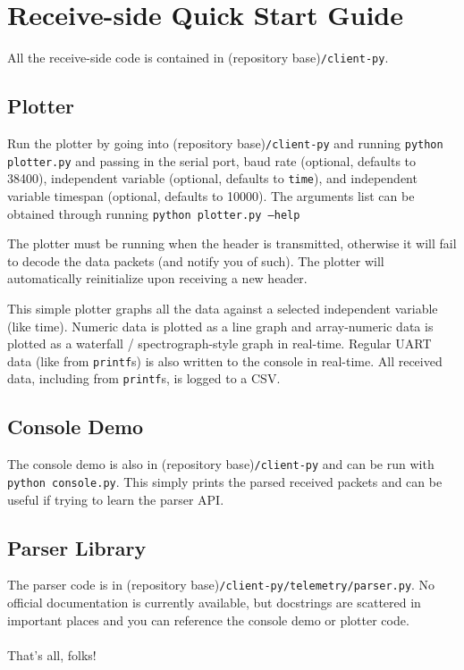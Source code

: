 \documentclass[11pt]{article}
\begin{document}
\section{Receive-side Quick Start Guide}
All the receive-side code is contained in (repository base)\texttt{/client-py}.
\subsection{Plotter}
Run the plotter by going into (repository base)\texttt{/client-py} and running \texttt{python plotter.py} and passing in the serial port, baud rate (optional, defaults to 38400), independent variable (optional, defaults to \texttt{time}), and independent variable timespan (optional, defaults to 10000). The arguments list can be obtained through running \texttt{python plotter.py --help}

The plotter must be running when the header is transmitted, otherwise it will fail to decode the data packets (and notify you of such). The plotter will automatically reinitialize upon receiving a new header.

This simple plotter graphs all the data against a selected independent variable (like time). Numeric data is plotted as a line graph and array-numeric data is plotted as a waterfall / spectrograph-style graph in real-time. Regular UART data (like from \texttt{printf}s) is also written to the console in real-time. All received data, including from \texttt{printf}s, is logged to a CSV.

\subsection{Console Demo}
The console demo is also in (repository base)\texttt{/client-py} and can be run with \texttt{python console.py}. This simply prints the parsed received packets and can be useful if trying to learn the parser API.

\subsection{Parser Library}
The parser code is in (repository base)\texttt{/client-py/telemetry/parser.py}. No official documentation is currently available, but docstrings are scattered in important places and you can reference the console demo or plotter code.
\\
\\
That's all, folks!
\end{document}
